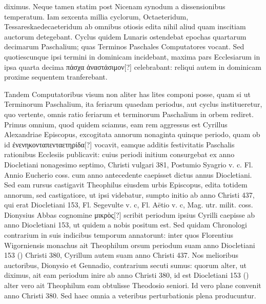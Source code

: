 diximus.
Neque tamen statim post Nicenam synodum a dissensionibus
temperatum.
Iam sexcenta millia cyclorum, Octaeteridum,
Tessareskaedecaeteridum ab omnibus otiosis edita nihil aliud quam
inscitiam auctorum detegebant.
Cyclus quidem Lunaris ostendebat
epochas quartarum decimarum Paschalium; quas Terminos Paschales
Computatores vocant.
Sed quotiescunque ipsi termini in dominicam
incidebant, 
 maxima pars Ecclesiarum in ipsa quarta decima
\textgreek{πάσχα ἀναστάσιμον[?]} celebrabant:
 reliqui autem in dominicam proxime
sequentem tranferebant.
\begin{table}[tb]
  
\end{table}
%
Tandem
Computatoribus visum non aliter has lites componi posse,
quam si ut Terminorum Paschalium,
ita feriarum quaedam periodus, aut cyclus
institueretur, quo vertente, omnis
ratio feriarum et terminorum Paschalium
in orbem rediret.
Primus
omnium, quod quidem sciamus, eam
rem aggressus est Cyrillus Alexandriae
Episcopus, excogitata annorum
nonaginta quinque periodo, quam ob
id \textgreek{ἐνενηκονταπενταετηρίδα[?]} vocavit, eamque
additis festivitatis Paschalis rationibus
Ecclesiis publicavit: cuius periodi
initium consurgebat ex anno
Diocletiani nonagesimo septimo, Christi
vulgari 381, Postumio Syagrio v. c. %
Fl. Annio Eucherio coss. cum anno antecedente caepisset dictus
annus Diocletiani.
%
Sed eam rursus castigavit Theophilus eiusdem urbis
Episcopus, edita totidem annorum, sed castigatiore, ut ipsi videbatur,
sumpto initio ab anno Christi 437, qui erat Diocletiani
153, Fl. Segevulte v. c, Fl. Aëtio v. c, Mag. utr. milit. coss. %
Dionysius
Abbas cognomine \textgreek{μικρὸς[?]} scribit periodum %
 ipsius Cyrilli caepisse
ab anno Diocletiani 153, ut quidem a nobis positum est.
Sed quidam
Chronologi contrarium in suis indicibus temporum annatorunt:
inter quos Florentius Wigorniensis monachus ait Theophilum
orsum periodum suam anno Diocletiani 153 () Christi
380, Cyrillum autem suam anno Christi 437.
Nos melioribus
auctoribus, Dionysio et Gennadio, contrarium secuti sumus: quorum
alter, ut diximus, ait eam periodum inire ab anno Christi 380,
id est Diocletiani 153 () alter vero ait Theophilum eam obtulisse
Theodosio seniori.
Id vero plane convenit anno Christi 380.
Sed haec omnia a veteribus perturbationis plena producuntur.
